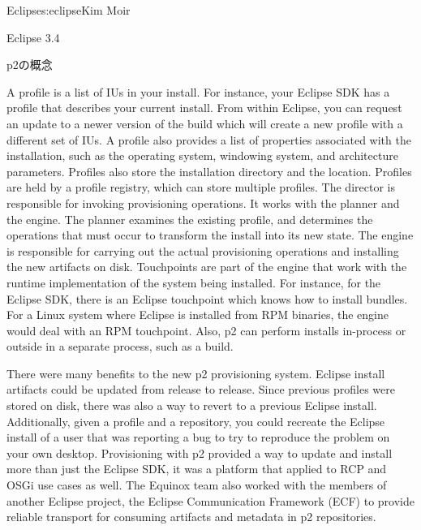 \begin{aosachapter}{Eclipse}{s:eclipse}{Kim Moir}
\begin{aosasect1}{Eclipse 3.4}
\begin{aosasect2}{p2の概念}

A profile is a list of IUs in your install. For instance, your Eclipse
SDK has a profile that describes your current install. From within
Eclipse, you can request an update to a newer version of the build
which will create a new profile with a different set of IUs. A profile
also provides a list of properties associated with the installation,
such as the operating system, windowing system, and architecture
parameters. Profiles also store the installation directory and the
location. Profiles are held by a profile registry, which can store
multiple profiles. The director is responsible for invoking
provisioning operations. It works with the planner and the engine. The
planner examines the existing profile, and determines the operations
that must occur to transform the install into its new state. The
engine is responsible for carrying out the actual provisioning
operations and installing the new artifacts on disk.  Touchpoints are
part of the engine that work with the runtime implementation of the
system being installed. For instance, for the Eclipse SDK, there is an
Eclipse touchpoint which knows how to install bundles. For a Linux
system where Eclipse is installed from RPM binaries, the engine would
deal with an RPM touchpoint. Also, p2 can perform installs in-process
or outside in a separate process, such as a build.

There were many benefits to the new p2 provisioning system. Eclipse
install artifacts could be updated from release to release. Since
previous profiles were stored on disk, there was also a way to revert
to a previous Eclipse install. Additionally, given a profile and a
repository, you could recreate the Eclipse install of a user that was
reporting a bug to try to reproduce the problem on your own desktop.
Provisioning with p2 provided a way to update and install more than
just the Eclipse SDK, it was a platform that applied to RCP and OSGi
use cases as well.  The Equinox team also worked with the members of
another Eclipse project, the Eclipse Communication Framework (ECF) to
provide reliable transport for consuming artifacts and metadata in p2
repositories.


\end{aosasect2}
\end{aosasect1}
\end{aosachapter}
